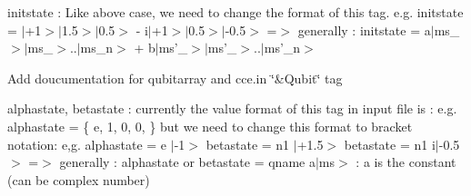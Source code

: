 \begin{DoxyRefList}
initstate \-: Like above case, we need to change the format of this tag. e.\-g. initstate = $|$+1$>$$|$1.5$>$$|$0.5$>$ -\/ i$|$+1$>$$|$0.5$>$$|$-\/0.5$>$ =$>$ generally \-: initstate = a$|$ms\-\_$>$$|$ms\-\_$>$..$|$ms\-\_\-n$>$ + b$|$ms'\-\_$>$$|$ms'\-\_$>$..$|$ms'\-\_\-n$>$ 

Add doucumentation for qubitarray and cce.\-in \char`\"{}\&\-Qubit\char`\"{} tag 

alphastate, betastate \-: currently the value format of this tag in input file is \-: e.\-g. alphastate = \{ e, 1, 0, 0, \} but we need to change this format to bracket notation\-: e,g. alphastate = e $|$-\/1$>$ betastate = n1 $|$+1.5$>$ betastate = n1 i$|$-\/0.5$>$ =$>$ generally \-: alphastate or betastate = qname a$|$ms$>$ \-: a is the constant (can be complex number) 
\end{DoxyRefList}
